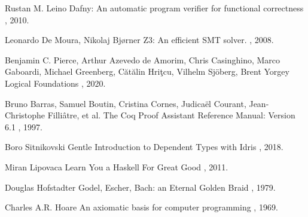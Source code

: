\documentclass{article}
\begin{document}
\begin{thebibliography}{1}

Rustan M. Leino
\newblock Dafny: An automatic program verifier for functional correctness
, 2010.

Leonardo De Moura, Nikolaj Bjørner
\newblock Z3: An efficient SMT solver.
, 2008.

Benjamin C. Pierce, Arthur Azevedo de Amorim, Chris Casinghino, Marco Gaboardi, Michael Greenberg, Cătălin Hriţcu, Vilhelm Sjöberg, Brent Yorgey
\newblock Logical Foundations
, 2020.

Bruno Barras, Samuel Boutin, Cristina Cornes, Judicaël Courant, Jean-Christophe Filliâtre, et al.
\newblock The Coq Proof Assistant Reference Manual: Version 6.1
, 1997.

Boro Sitnikovski
\newblock Gentle Introduction to Dependent Types with Idris
, 2018.

Miran Lipovaca
\newblock Learn You a Haskell For Great Good
, 2011.

Douglas Hofstadter
\newblock Godel, Escher, Bach: an Eternal Golden Braid
, 1979.

Charles A.R. Hoare
\newblock An axiomatic basis for computer programming
, 1969.

\end{thebibliography}
\end{document}
